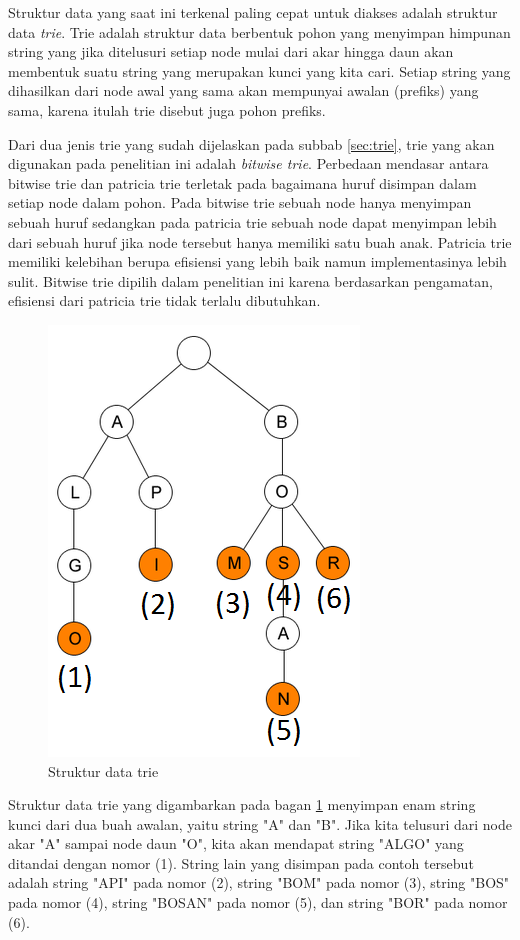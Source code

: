 Struktur data yang saat ini terkenal paling cepat untuk diakses adalah struktur data \textit{trie}. Trie adalah struktur data berbentuk pohon yang menyimpan himpunan string yang jika ditelusuri setiap node mulai dari akar hingga daun akan membentuk suatu string yang merupakan kunci yang kita cari. Setiap string yang dihasilkan dari node awal yang sama akan mempunyai awalan (prefiks) yang sama, karena itulah trie disebut juga pohon prefiks.

Dari dua jenis trie yang sudah dijelaskan pada subbab \ref{sec:trie}, trie yang akan digunakan pada penelitian ini adalah \textit{bitwise trie}. Perbedaan mendasar antara bitwise trie dan patricia trie terletak pada bagaimana huruf disimpan dalam setiap node dalam pohon. Pada bitwise trie sebuah node hanya menyimpan sebuah huruf sedangkan pada patricia trie sebuah node dapat menyimpan lebih dari sebuah huruf jika node tersebut hanya memiliki satu buah anak. Patricia trie memiliki kelebihan berupa efisiensi yang lebih baik namun implementasinya lebih sulit. Bitwise trie dipilih dalam penelitian ini karena berdasarkan pengamatan, efisiensi dari patricia trie tidak terlalu dibutuhkan.

\begin{figure}[H]
\centering
\includegraphics[scale=0.75]{Gambar/gambar-trie}
\caption[Struktur data trie]{Struktur data trie} 
\label{bagan-trie}
\end{figure}

Struktur data trie yang digambarkan pada bagan \ref{bagan-trie} menyimpan enam string kunci dari dua buah awalan, yaitu string "A" dan "B". Jika kita telusuri dari node akar "A" sampai node daun "O", kita akan mendapat string "ALGO" yang ditandai dengan nomor (1). String lain yang disimpan pada contoh tersebut adalah string "API" pada nomor (2), string "BOM" pada nomor (3), string "BOS" pada nomor (4), string "BOSAN" pada nomor (5), dan string "BOR" pada nomor (6).

